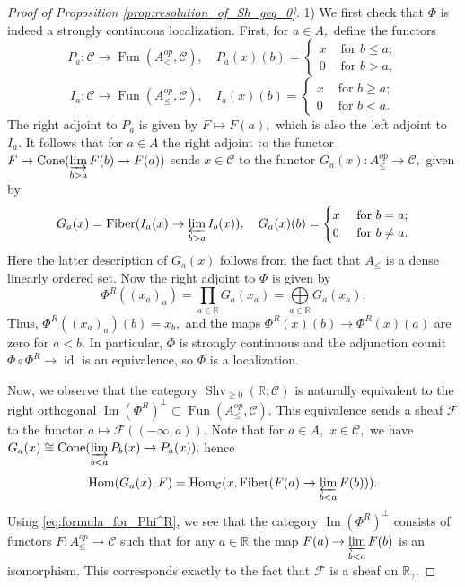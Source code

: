 \documentclass[11pt,leqno]{amsart}
\newtheorem{remark}[theo]{Remark}
\numberwithin{equation}{section}
\def\R{\mathbb{R}}
\def\Hom{\operatorname{Hom}}
\newcommand{\indlim}[1][]{\mathop{\varinjlim}\limits_{#1}}
\newcommand{\prolim}[1][]{\mathop{\varprojlim}\limits_{#1}}
\newcommand{\prodd}[1][]{\mathop{\prod}\limits_{#1}}
\newcommand{\limproj}{\varprojlim}
\newcommand{\Cone}{\operatorname{Cone}}
\newcommand{\Fiber}{\operatorname{Fiber}}
\newcommand{\cF}{{\mathcal F}}
\newcommand{\cC}{{\mathcal C}}
\newcommand{\Fun}{\operatorname{Fun}}
\newcommand{\Sh}{\operatorname{Shv}}
\newcommand{\im}{\operatorname{Im}}
\newcommand{\Sp}{\operatorname{Sp}}
\newcommand{\id}{\operatorname{id}}
\begin{document}

\begin{proof}[Proof of Proposition \ref{prop:resolution_of_Sh_geq_0}] 1) We first check that $\Phi$ is indeed a strongly continuous localization. First, for $a\in A,$ define the functors 
\begin{equation}\label{eq:functors_P_a} P_a:\cC\to \Fun(A_{\leq}^{op},\cC),\quad P_a(x)(b)=\begin{cases}x & \text{ for }b\leq a;\\
0 & \text{ for }b>a,\end{cases}\end{equation}
$$I_a:\cC\to \Fun(A_{\leq}^{op},\cC),\quad I_a(x)(b)=\begin{cases}x & \text{ for }b\geq a;\\
0 & \text{ for }b<a.\end{cases}$$ 
The right adjoint to $P_a$ is given by $F\mapsto F(a),$ which is also the left adjoint to $I_a.$ It follows that for $a\in A$ the right adjoint to the functor $F\mapsto \Cone(\indlim[b>a]F(b)\to F(a))$ sends $x\in\cC$ to the functor $G_a(x):A_{\leq}^{op}\to\cC,$ given by 
$$G_a(x)=\Fiber(I_a(x)\to\limproj\limits_{b>a}I_b(x)),\quad G_a(x)(b)=\begin{cases}x & \text{ for }b=a;\\
0 & \text{ for }b\ne a.\end{cases}$$
Here the latter description of $G_a(x)$ follows from the fact that $A_{\leq}$ is a dense linearly ordered set. Now the right adjoint to $\Phi$ is given by \begin{equation}\label{eq:formula_for_Phi^R}\Phi^R((x_a)_a)=\prodd[a\in\R]G_a(x_a)=\bigoplus\limits_{a\in\R}G_a(x_a).\end{equation}
Thus, $\Phi^R((x_a)_a)(b)=x_b,$ and the maps $\Phi^R(x)(b)\to\Phi^R(x)(a)$ are zero for $a<b.$ In particular, $\Phi$ is strongly continuous and the adjunction counit $\Phi\circ\Phi^R\to\id$ is an equivalence, so $\Phi$ is a localization.

Now, we observe that the category $\Sh_{\geq 0}(\R;\cC)$ is naturally equivalent to the right orthogonal $\im(\Phi^R)^{\perp}\subset\Fun(A_{\leq}^{op},\cC).$ This equivalence sends a sheaf $\cF$ to the functor $a\mapsto \cF((-\infty,a)).$ Note that for $a\in A,$ $x\in\cC,$ we have $G_a(x)\cong\Cone(\indlim[b<a]P_b(x)\to P_a(x)),$ hence $$\Hom(G_a(x),F)=\Hom_{\cC}(x,\Fiber(F(a)\to\prolim[b<a]F(b))).$$ Using \eqref{eq:formula_for_Phi^R}, we see that the category $\im(\Phi^R)^{\perp}$ consists of functors $F:A_{\leq}^{op}\to \cC$ such that for any $a\in\R$ the map $F(a)\to\prolim[b<a]F(b)$ is an isomorphism. This corresponds exactly to the fact that $\cF$ is a sheaf on $\R_{\gamma}.$


\end{proof}
\end{document}
